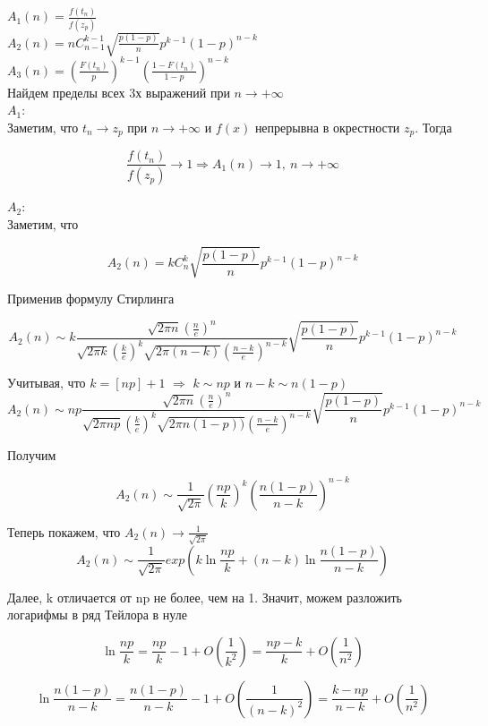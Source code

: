 \documentclass{article}
\begin{document}
$A_1(n) = \frac{f(t_n)}{f(z_p)}$\\
$A_2(n) = nC_{n-1}^{k-1}\sqrt{\frac{p(1-p)}{n}}p^{k-1}(1-p)^{n-k}$\\
$A_3(n) = \left(\frac{F(t_n)}{p}\right)^{k-1}\left(\frac{1-F(t_n)}{1-p}\right)^{n-k}$\\

Найдем пределы всех 3х выражений при $n\rightarrow+\infty$\\

$A_1$:\\
Заметим, что $t_n\rightarrow z_p$ при $n\rightarrow+\infty$ и $f(x)$ непрерывна в окрестности $z_p$.
Тогда

$$ \frac{f(t_n)}{f(z_p)}\rightarrow 1 \Rightarrow A_1(n)\rightarrow 1,\ n\rightarrow+\infty$$

$A_2$:\\

Заметим, что

$$ A_2(n) = kC_n^k\sqrt{\frac{p(1-p)}{n}}p^{k-1}(1-p)^{n-k} $$

Применив формулу Стирлинга

$$ A_2(n)\sim k\frac{\sqrt{2\pi n}\left(\frac{n}{e}\right)^n}{\sqrt{2\pi k}\left(\frac{k}{e}\right)^k \sqrt{2\pi (n-k)}\left(\frac{n-k}{e}\right)^{n-k}}\sqrt{\frac{p(1-p)}{n}}p^{k-1}(1-p)^{n-k} $$

Учитывая, что $k = [np] + 1$ $\Rightarrow$ $k\sim np$ и $n-k\sim n(1-p)$\\

$$ A_2(n)\sim np\frac{\sqrt{2\pi n}\left(\frac{n}{e}\right)^n}{\sqrt{2\pi np}\left(\frac{k}{e}\right)^k \sqrt{2\pi n(1-p))}\left(\frac{n-k}{e}\right)^{n-k}}\sqrt{\frac{p(1-p)}{n}}p^{k-1}(1-p)^{n-k} $$

Получим

$$A_2(n)\sim\frac{1}{\sqrt{2\pi}}\left(\frac{np}{k}\right)^k\left(\frac{n(1-p)}{n-k}\right)^{n-k}$$

Теперь покажем, что $A_2(n)\rightarrow\frac{1}{\sqrt{2\pi}}$\\

$$A_2(n)\sim\frac{1}{\sqrt{2\pi}}exp\left(k\ln{\frac{np}{k}} + (n-k)\ln{\frac{n(1-p)}{n-k}}\right)$$

Далее, k отличается от np не более, чем на 1. Значит, можем разложить логарифмы в ряд Тейлора в нуле

$$ \ln{\frac{np}{k}} = \frac{np}{k} - 1 + O\left(\frac{1}{k^2}\right) = \frac{np - k}{k} + O\left(\frac{1}{n^2}\right)$$

$$\ln{\frac{n(1-p)}{n - k}} = \frac{n(1-p)}{n - k} - 1 + O\left(\frac{1}{(n-k)^2}\right) = \frac{k - np}{n - k} + O\left(\frac{1}{n^2}\right)$$
\end{document}
